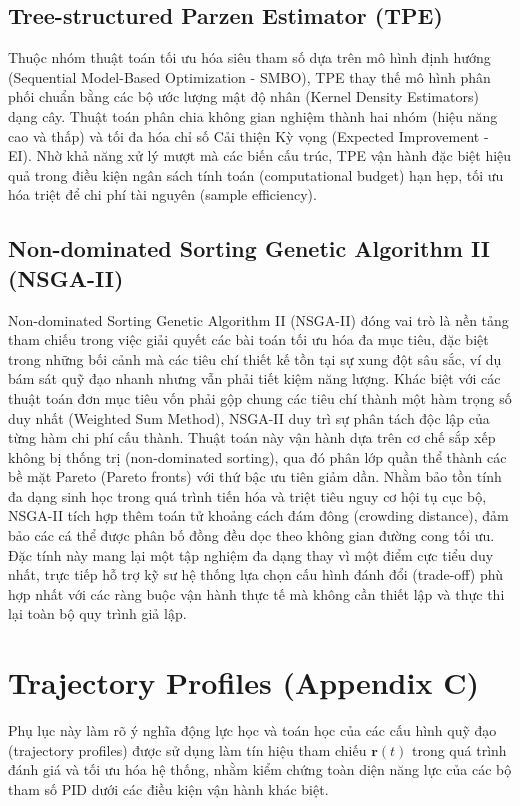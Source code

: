 \documentclass[conference, a4paper]{IEEEtran}
\begin{document}
\subsection{Tree-structured Parzen Estimator (TPE)}
Thuộc nhóm thuật toán tối ưu hóa siêu tham số dựa trên mô hình định hướng (Sequential Model-Based Optimization - SMBO), TPE thay thế mô hình phân phối chuẩn bằng các bộ ước lượng mật độ nhân (Kernel Density Estimators) dạng cây. Thuật toán phân chia không gian nghiệm thành hai nhóm (hiệu năng cao và thấp) và tối đa hóa chỉ số Cải thiện Kỳ vọng (Expected Improvement - EI). Nhờ khả năng xử lý mượt mà các biến cấu trúc, TPE vận hành đặc biệt hiệu quả trong điều kiện ngân sách tính toán (computational budget) hạn hẹp, tối ưu hóa triệt để chi phí tài nguyên (sample efficiency).

\subsection{Non-dominated Sorting Genetic Algorithm II (NSGA-II)}
Non-dominated Sorting Genetic Algorithm II (NSGA-II) đóng vai trò là nền tảng tham chiếu trong việc giải quyết các bài toán tối ưu hóa đa mục tiêu, đặc biệt trong những bối cảnh mà các tiêu chí thiết kế tồn tại sự xung đột sâu sắc, ví dụ bám sát quỹ đạo nhanh nhưng vẫn phải tiết kiệm năng lượng. Khác biệt với các thuật toán đơn mục tiêu vốn phải gộp chung các tiêu chí thành một hàm trọng số duy nhất (Weighted Sum Method), NSGA-II duy trì sự phân tách độc lập của từng hàm chi phí cấu thành. Thuật toán này vận hành dựa trên cơ chế sắp xếp không bị thống trị (non-dominated sorting), qua đó phân lớp quần thể thành các bề mặt Pareto (Pareto fronts) với thứ bậc ưu tiên giảm dần. Nhằm bảo tồn tính đa dạng sinh học trong quá trình tiến hóa và triệt tiêu nguy cơ hội tụ cục bộ, NSGA-II tích hợp thêm toán tử khoảng cách đám đông (crowding distance), đảm bảo các cá thể được phân bố đồng đều dọc theo không gian đường cong tối ưu. Đặc tính này mang lại một tập nghiệm đa dạng thay vì một điểm cực tiểu duy nhất, trực tiếp hỗ trợ kỹ sư hệ thống lựa chọn cấu hình đánh đổi (trade-off) phù hợp nhất với các ràng buộc vận hành thực tế mà không cần thiết lập và thực thi lại toàn bộ quy trình giả lập.

\section{Trajectory Profiles (Appendix C)}
Phụ lục này làm rõ ý nghĩa động lực học và toán học của các cấu hình quỹ đạo (trajectory profiles) được sử dụng làm tín hiệu tham chiếu $\mathbf{r}(t)$ trong quá trình đánh giá và tối ưu hóa hệ thống, nhằm kiểm chứng toàn diện năng lực của các bộ tham số PID dưới các điều kiện vận hành khác biệt.
\end{document}

